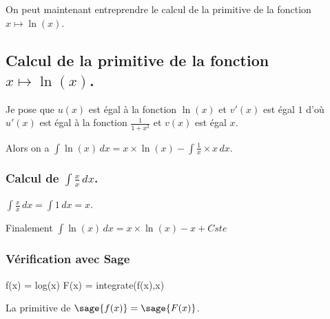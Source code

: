 \documentclass[a4paper,14pt]{extreport} %
\begin{document}
On peut maintenant entreprendre le calcul de la primitive de la  fonction  $x \mapsto \ln(x) $.






\subsection{Calcul de la primitive de la fonction  $x \mapsto \ln(x) $.}


Je pose que $u(x)$  est égal à la fonction $\ln(x)$ et $v'(x)$ est égal $1$  d'où $u'(x)$  est égal à la fonction $ \frac{1}{1+ x^2} $ et $v(x)$ est égal $x$.

Alors on a $\int \ln(x) \, dx = x \times \ln(x) -\int \frac{1}{x} \times x \, dx $.


\subsubsection{Calcul de $\int \frac{x}{x} \, dx $.}

$\int \frac{x}{x} \, dx = \int 1 \, dx = x$.


Finalement $\int \ln(x) \, dx = x \times \ln(x) -x + Cste $

\subsubsection{Vérification avec Sage}

\begin{sageblock}
    f(x) = log(x)
    F(x) = integrate(f(x),x)
\end{sageblock}

La primitive de $\sage{f(x)} = \sage{F(x)} $.
\end{document}
